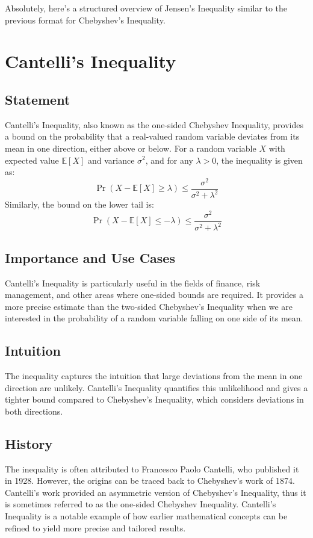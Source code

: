 \documentclass{article}
\begin{document}
Absolutely, here's a structured overview of Jensen's Inequality similar to the previous format for Chebyshev's Inequality.

\section{Cantelli's Inequality}

\subsection{Statement}
Cantelli's Inequality, also known as the one-sided Chebyshev Inequality, provides a bound on the probability that a real-valued random variable deviates from its mean in one direction, either above or below. For a random variable \(X\) with expected value \( \mathbb{E}[X] \) and variance \( \sigma^2 \), and for any \( \lambda > 0 \), the inequality is given as:
\[ \Pr(X - \mathbb{E}[X] \geq \lambda) \leq \frac{\sigma^2}{\sigma^2 + \lambda^2} \]
Similarly, the bound on the lower tail is:
\[ \Pr(X - \mathbb{E}[X] \leq -\lambda) \leq \frac{\sigma^2}{\sigma^2 + \lambda^2} \]

\subsection{Importance and Use Cases}
Cantelli's Inequality is particularly useful in the fields of finance, risk management, and other areas where one-sided bounds are required. It provides a more precise estimate than the two-sided Chebyshev's Inequality when we are interested in the probability of a random variable falling on one side of its mean.

\subsection{Intuition}
The inequality captures the intuition that large deviations from the mean in one direction are unlikely. Cantelli's Inequality quantifies this unlikelihood and gives a tighter bound compared to Chebyshev's Inequality, which considers deviations in both directions.

\subsection{History}
The inequality is often attributed to Francesco Paolo Cantelli, who published it in 1928. However, the origins can be traced back to Chebyshev's work of 1874. Cantelli's work provided an asymmetric version of Chebyshev's Inequality, thus it is sometimes referred to as the one-sided Chebyshev Inequality. Cantelli's Inequality is a notable example of how earlier mathematical concepts can be refined to yield more precise and tailored results.
\end{document}
